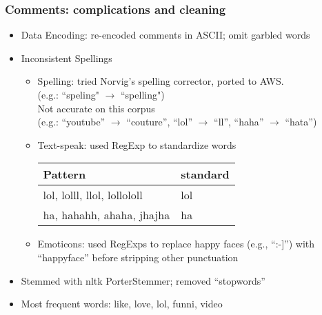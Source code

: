 \documentclass[fleqn]{beamer}
\begin{document}
\begin{frame}
\frametitle{Comments: complications and cleaning}
    \begin{itemize}
   	\item Data Encoding: re-encoded comments in ASCII; omit garbled words
        \item Inconsistent Spellings 
        	\begin{itemize}
		\item Spelling: tried Norvig's spelling corrector, ported to AWS. \\
		(e.g.: ``speling"  $\rightarrow$ ``spelling")\\
                Not accurate on this corpus\\
                  (e.g.: ``youtube'' $\rightarrow$ ``couture'', 
                    ``lol'' $\rightarrow$ ``ll'', ``haha'' $\rightarrow$ ``hata'')
                   \item Text-speak:  used RegExp to standardize words\\
		\begin{center}
        			\begin{tabular}{ | l | l |}
			\hline
			Pattern & standard \\ \hline
			lol, lolll, llol, lollololl & lol \\ \hline
			ha, hahahh, ahaha, jhajha & ha \\
			\hline
			\end{tabular}

      		\end{center}
		\item Emoticons: used RegExps to replace happy faces (e.g., ``:-]'') with 
                ``happyface'' 
                  before stripping other punctuation
	\end{itemize}
                \item Stemmed with nltk PorterStemmer; removed ``stopwords''
                \item Most frequent words: like, love, lol, funni, video
    \end{itemize}
\end{frame}
\end{document}
